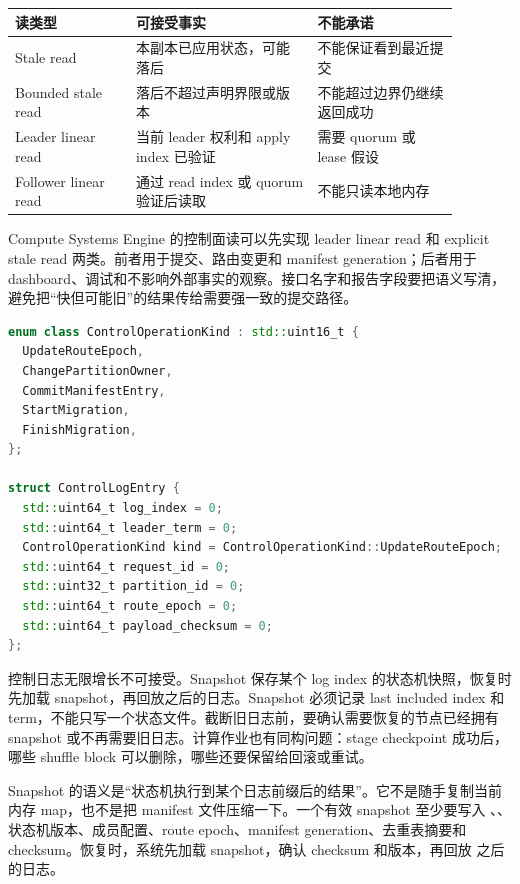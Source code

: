 \begin{center}
\small
\begin{tabular}{@{}p{0.24\linewidth}p{0.36\linewidth}p{0.28\linewidth}@{}}
\toprule
读类型 & 可接受事实 & 不能承诺 \\
\midrule
Stale read & 本副本已应用状态，可能落后 & 不能保证看到最近提交 \\
Bounded stale read & 落后不超过声明界限或版本 & 不能超过边界仍继续返回成功 \\
Leader linear read & 当前 leader 权利和 apply index 已验证 & 需要 quorum 或 lease 假设 \\
Follower linear read & 通过 read index 或 quorum 验证后读取 & 不能只读本地内存 \\
\bottomrule
\end{tabular}
\end{center}

Compute Systems Engine 的控制面读可以先实现 leader linear read 和 explicit stale read 两类。前者用于提交、路由变更和 manifest generation；后者用于 dashboard、调试和不影响外部事实的观察。接口名字和报告字段要把语义写清，避免把“快但可能旧”的结果传给需要强一致的提交路径。

\begin{lstlisting}[language=C++,caption={控制日志条目的示例形态}]
enum class ControlOperationKind : std::uint16_t {
  UpdateRouteEpoch,
  ChangePartitionOwner,
  CommitManifestEntry,
  StartMigration,
  FinishMigration,
};

struct ControlLogEntry {
  std::uint64_t log_index = 0;
  std::uint64_t leader_term = 0;
  ControlOperationKind kind = ControlOperationKind::UpdateRouteEpoch;
  std::uint64_t request_id = 0;
  std::uint32_t partition_id = 0;
  std::uint64_t route_epoch = 0;
  std::uint64_t payload_checksum = 0;
};
\end{lstlisting}

控制日志无限增长不可接受。Snapshot 保存某个 log index 的状态机快照，恢复时先加载 snapshot，再回放之后的日志。Snapshot 必须记录 last included index 和 term，不能只写一个状态文件。截断旧日志前，要确认需要恢复的节点已经拥有 snapshot 或不再需要旧日志。计算作业也有同构问题：stage checkpoint 成功后，哪些 shuffle block 可以删除，哪些还要保留给回滚或重试。

Snapshot 的语义是“状态机执行到某个日志前缀后的结果”。它不是随手复制当前内存 map，也不是把 manifest 文件压缩一下。一个有效 snapshot 至少要写入 、、状态机版本、成员配置、route epoch、manifest generation、去重表摘要和 checksum。恢复时，系统先加载 snapshot，确认 checksum 和版本，再回放  之后的日志。

